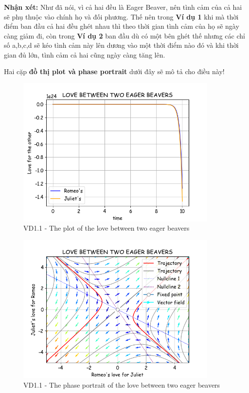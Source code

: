 \begin{tcbdoublebox}[title={1. Eager Beaver and Eager Beaver}]
\textbf{Nhận xét: } Như đã nói, vì cả hai đều là Eager Beaver, nên tình cảm của cả hai sẽ phụ thuộc vào chính họ và đối phương. Thế nên trong \textbf{Ví dụ 1} khi mà thời điểm ban đầu cả hai đều ghét nhau thì theo thời gian tình cảm của họ sẽ ngày càng giảm đi, còn trong \textbf{Ví dụ 2} ban đầu dù có một bên ghét thế nhưng các chỉ số a,b,c,d sẽ kéo tình cảm này lên dương vào một thời điểm nào đó và khi thời gian đủ lớn, tình cảm cả hai cũng ngày càng tăng lên. 

Hai cặp \textbf{đồ thị plot và phase portrait} dưới đây sẽ mô tả cho điều này!
\end{tcbdoublebox}
\pagebreak
\begin{figure}[!htbp]
    \centering
    \includegraphics[width=100mm]{image/bt2/plot1.1.png}
    \caption{VD1.1 - The plot of the love between two eager beavers }
\end{figure}
\begin{figure}[!htbp]
    \centering
    \includegraphics[width=100mm]{image/bt2/pp1.1.png}
    \caption{VD1.1 - The phase portrait of the love between two eager beavers}
\end{figure}

